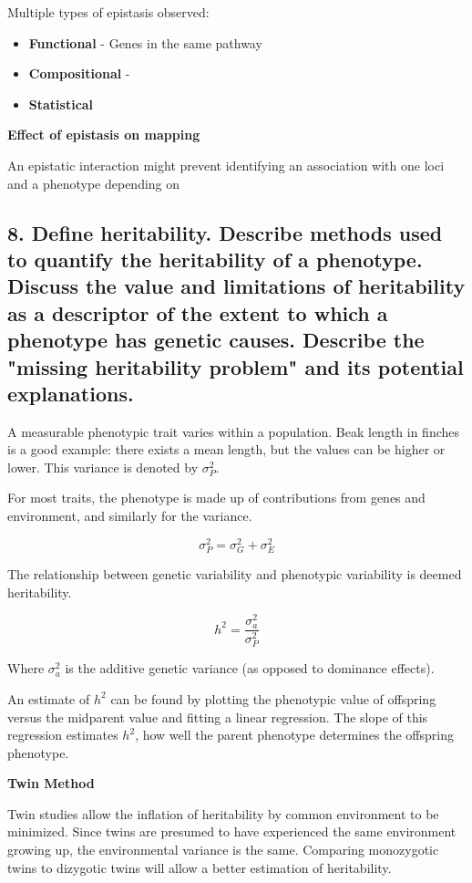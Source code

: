 \documentclass{tufte-handout}
\theoremstyle{noparens}
\begin{document}
Multiple types of epistasis observed:

\begin{itemize}
\item \textbf{Functional} - Genes in the same pathway
\item \textbf{Compositional} - 
\item \textbf{Statistical}
\end{itemize}

\noindent
\textbf{Effect of epistasis on mapping}

An epistatic interaction might prevent identifying an association with one loci and a phenotype depending on 
\newpage
\subsection{8. Define heritability. Describe methods used to quantify the heritability of a phenotype. Discuss the value and limitations of heritability as a descriptor of the extent to which a phenotype has genetic causes. Describe the "missing heritability problem" and its potential explanations.}
\label{subsec:08}

A measurable phenotypic trait varies within a population. Beak length in finches is a good example: there exists a mean length, but the values can be higher or lower. This variance is denoted by $\sigma_P^2$.

For most traits, the phenotype is made up of contributions from genes and environment, and similarly for the variance.

\[ \sigma_P^2 = \sigma_G^2 + \sigma_E^2 \]

The relationship between genetic variability and phenotypic variability is deemed heritability. 

\[ h^2 = \frac{\sigma_a^2}{\sigma_P^2} \]

Where $\sigma_a^2$ is the additive genetic variance (as opposed to dominance effects).

An estimate of $h^2$ can be found by plotting the phenotypic value of offspring versus the midparent value and fitting a linear regression. The slope of this regression estimates $h^2$, how well the parent phenotype determines the offspring phenotype.

\textbf{Twin Method}

Twin studies allow the inflation of heritability by common environment to be minimized. Since twins are presumed to have experienced the same environment growing up, the environmental variance is the same. Comparing monozygotic twins to dizygotic twins will allow a better estimation of heritability. 
\end{document}
